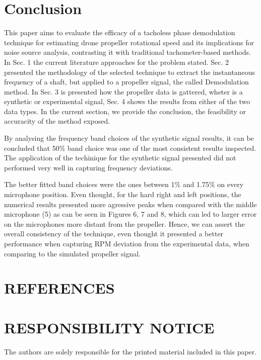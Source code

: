 \documentclass[10pt,fleqn,a4paper,twoside]{article}
\begin{document}
\section{Conclusion}

This paper aims to evaluate the efficacy of a tacholess phase demodulation technique for estimating drone propeller rotational speed and its implications for noise source analysis, contrasting it with traditional tachometer-based methods. In Sec. 1 the current literature approaches for the problem stated. Sec. 2 presented the methodology of the selected technique to extract the instantaneous frequency of a shaft, but applied to a propeller signal, the called Demodulation method. In Sec. 3 is presented how the propeller data is gattered, wheter is a synthetic or experimental signal, Sec. 4 shows the results from either of the two data types. In the current section, we provide the conclusion, the feasibility or accuracity of the method exposed.

By analysing the frequency band choices of the synthetic signal results, it can be concluded that 50\% band choice was one of the most consistent results inspected. The application of the techinique for the synthetic signal presented did not performed very well in capturing frequency deviations.

The better fitted band choices were the ones between 1\% and 1.75\% on every microphone position. Even thought, for the hard right and left positions, the numerical results presented more agressive peaks when compared with the middle microphone (5) as can be seen in Figures 6, 7 and 8, which can led to larger error on the microphones more distant from the propeller. Hence, we can assert the overall consistency of the technique, even thought it presented a better performance when capturing RPM deviation from the experimental data, when comparing to the simulated propeller signal.


\section{REFERENCES}

\renewcommand{\refname}{}


\section{RESPONSIBILITY NOTICE}


The authors are solely responsible for the printed material included in this paper.
\end{document}
